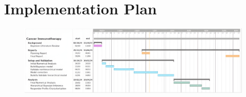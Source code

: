 \documentclass[11pt]{article}
\begin{document}
\section{Implementation Plan}\label{sec:plan}

\begin{figure}[!ht]
    \centering\includegraphics[scale=0.32]{gantt.png}
\end{figure}

\clearpage
\newpage
\appendix
\end{document}
